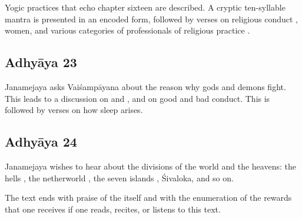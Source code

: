 Yogic practices that echo chapter sixteen are described.
A cryptic ten-syllable mantra is presented in an encoded form, followed by
verses on religious conduct , women, and various categories of
professionals of religious practice .

\subsection*{Adhyāya 23}\label{contents_of_ch23}
Janamejaya asks Vaiśampāyana about the reason why gods and demons fight. 
This leads to a discussion on  and , and on good and bad conduct.
This is followed by verses on how sleep arises.

\subsection*{Adhyāya 24}\label{contents_of_ch24}
Janamejaya wishes to hear about the divisions of the world and the heavens: the hells ,
the netherworld , the seven islands , Śivaloka, and so on.

The text ends with praise of the  itself and with the enumeration of the rewards
that one receives if one reads, recites, or listens to this text.

\vfill
\pagebreak


\vfill


